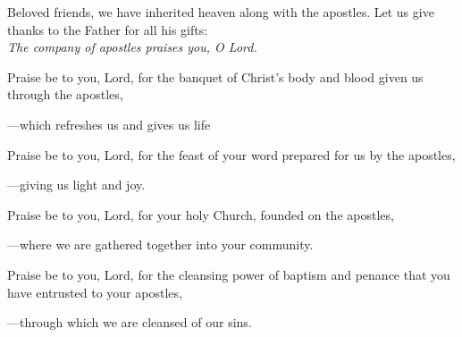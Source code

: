 \intercessions\indent

\begin{hangpar}

Beloved friends, we have inherited heaven along with the apostles. Let us give thanks to the Father for all his gifts:\\
\emph{The company of apostles praises you, O Lord.}

\medskip Praise be to you, Lord, for the banquet of Christ's body and blood given us through the apostles,

{\color{red}---\thinspace}which refreshes us and gives us life

\medskip Praise be to you, Lord, for the feast of your word prepared for us by the apostles,

{\color{red}---\thinspace}giving us light and joy.

\medskip Praise be to you, Lord, for your holy Church, founded on the apostles,

{\color{red}---\thinspace}where we are gathered together into your community.

\medskip Praise be to you, Lord, for the cleansing power of baptism and penance that you have entrusted to your apostles,

{\color{red}---\thinspace}through which we are cleansed of our sins.

\end{hangpar}
